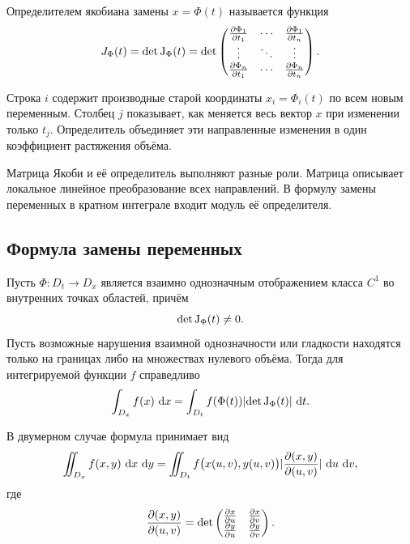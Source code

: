 \begin{definition}
Определителем якобиана замены $x=\Phi(t)$ называется функция
\[
J_{\Phi}(t)
=
\det\mathrm{J}_{\Phi}(t)
=
\det
\begin{pmatrix}
\frac{\partial \Phi_1}{\partial t_1}&\cdots&\frac{\partial \Phi_1}{\partial t_n}\\
\vdots&\ddots&\vdots\\
\frac{\partial \Phi_n}{\partial t_1}&\cdots&\frac{\partial \Phi_n}{\partial t_n}
\end{pmatrix}.
\]
\end{definition}

Строка $i$ содержит производные старой координаты $x_i=\Phi_i(t)$ по всем новым переменным. Столбец $j$ показывает, как меняется весь вектор $x$ при изменении только $t_j$. Определитель объединяет эти направленные изменения в один коэффициент растяжения объёма.

\begin{caution}
Матрица Якоби и её определитель выполняют разные роли. Матрица описывает локальное линейное преобразование всех направлений. В формулу замены переменных в кратном интеграле входит модуль её определителя.
\end{caution}

\subsection{Формула замены переменных}

\begin{theorem}
Пусть $\Phi:D_t\to D_x$ является взаимно однозначным отображением класса $C^1$ во внутренних точках областей, причём
\[
\det\mathrm{J}_{\Phi}(t)\neq0.
\]
Пусть возможные нарушения взаимной однозначности или гладкости находятся только на границах либо на множествах нулевого объёма. Тогда для интегрируемой функции $f$ справедливо
\begin{equation}
\label{eq:change-of-variables}
\int_{D_x}f(x)\,\mathop{}\!\mathrm{d} x
=
\int_{D_t}
 f(\Phi(t))
 \lvert\det\mathrm{J}_{\Phi}(t)\rvert
\,\mathop{}\!\mathrm{d} t.
\end{equation}
\end{theorem}

В двумерном случае формула принимает вид
\[
\iint_{D_x}f(x,y)\,\mathop{}\!\mathrm{d} x\,\mathop{}\!\mathrm{d} y
=
\iint_{D_t}
 f\bigl(x(u,v),y(u,v)\bigr)
 \lvert\frac{\partial (x,y)}{\partial (u,v)}\rvert
\,\mathop{}\!\mathrm{d} u\,\mathop{}\!\mathrm{d} v,
\]
где
\[
\frac{\partial (x,y)}{\partial (u,v)}
=
\det
\begin{pmatrix}
\frac{\partial x}{\partial u}&\frac{\partial x}{\partial v}\\
\frac{\partial y}{\partial u}&\frac{\partial y}{\partial v}
\end{pmatrix}.
\]

